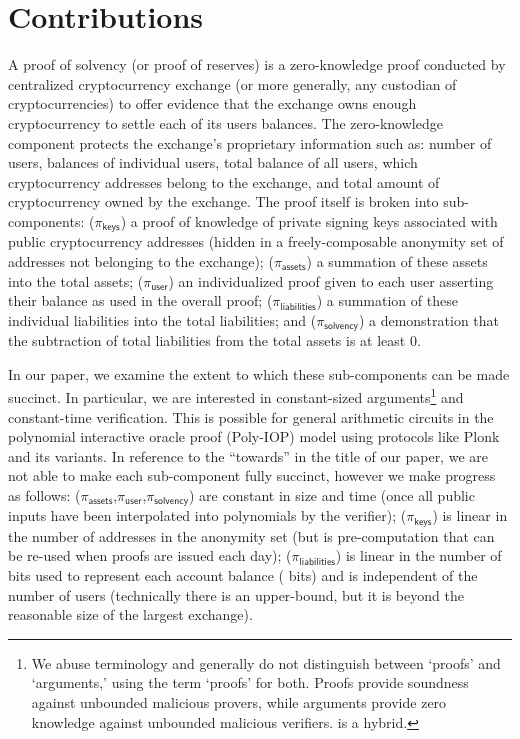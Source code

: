
\section{Contributions}

A proof of solvency (or proof of reserves) is a zero-knowledge proof conducted by centralized cryptocurrency exchange (or more generally, any custodian of cryptocurrencies) to offer evidence that the exchange owns enough cryptocurrency to settle each of its users balances. The zero-knowledge component protects the exchange's proprietary information such as: number of users, balances of individual users, total balance of all users, which cryptocurrency addresses belong to the exchange, and total amount of cryptocurrency owned by the exchange. The proof itself is broken into sub-components: ($\pi_\mathsf{keys}$) a proof of knowledge of private signing keys associated with public cryptocurrency addresses (hidden in a freely-composable anonymity set of addresses not belonging to the exchange); ($\pi_\mathsf{assets}$) a summation of these assets into the total assets; ($\pi_\mathsf{user}$) an individualized proof given to each user asserting their balance as used in the overall proof; ($\pi_\mathsf{liabilities}$) a summation of these individual liabilities into the total liabilities; and ($\pi_\mathsf{solvency}$) a demonstration that the subtraction of total liabilities from the total assets is at least 0.

In our paper, we examine the extent to which these sub-components can be made succinct. In particular, we are interested in constant-sized arguments\footnote{We abuse terminology and generally do not distinguish between `proofs' and `arguments,' using the term `proofs' for both. Proofs provide soundness against unbounded malicious provers, while arguments provide zero knowledge against unbounded malicious verifiers. \Sys is a hybrid.} and constant-time verification. This is possible for general arithmetic circuits in the polynomial interactive oracle proof (Poly-IOP) model using protocols like Plonk and its variants. In reference to the ``towards'' in the title of our paper, we are not able to make each sub-component fully succinct, however we make progress as follows: ($\pi_\mathsf{assets}$,$\pi_\mathsf{user}$,$\pi_\mathsf{solvency}$) are constant in size and time (once all public inputs have been interpolated into polynomials by the verifier); ($\pi_\mathsf{keys}$) is linear in the number of addresses in the anonymity set (but is pre-computation that can be re-used when proofs are issued each day); ($\pi_\mathsf{liabilities}$) is linear in the number of bits used to represent each account balance ( bits) and is independent of the number of users (technically there is an upper-bound, but it is beyond the reasonable size of the largest exchange).

